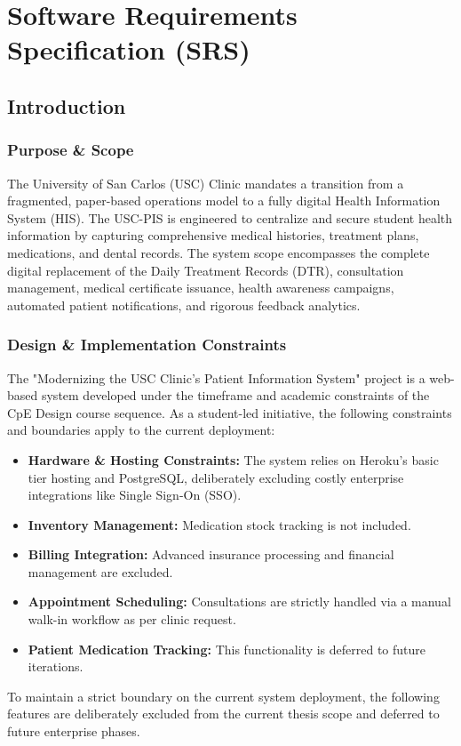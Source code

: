 
\chapter{Software Requirements Specification (SRS)}
\label{appendix:srs}

\section{Introduction}

\subsection{Purpose \& Scope}
The University of San Carlos (USC) Clinic mandates a transition from a fragmented, paper-based operations model to a fully digital Health Information System (HIS). The USC-PIS is engineered to centralize and secure student health information by capturing comprehensive medical histories, treatment plans, medications, and dental records. The system scope encompasses the complete digital replacement of the Daily Treatment Records (DTR), consultation management, medical certificate issuance, health awareness campaigns, automated patient notifications, and rigorous feedback analytics.

\subsection{Design \& Implementation Constraints}
The "Modernizing the USC Clinic's Patient Information System" project is a web-based system developed under the timeframe and academic constraints of the CpE Design course sequence. As a student-led initiative, the following constraints and boundaries apply to the current deployment:
\begin{itemize}
    \item \textbf{Hardware \& Hosting Constraints:} The system relies on Heroku's basic tier hosting and PostgreSQL, deliberately excluding costly enterprise integrations like Single Sign-On (SSO).
    \item \textbf{Inventory Management:} Medication stock tracking is not included.
    \item \textbf{Billing Integration:} Advanced insurance processing and financial management are excluded.
    \item \textbf{Appointment Scheduling:} Consultations are strictly handled via a manual walk-in workflow as per clinic request.
    \item \textbf{Patient Medication Tracking:} This functionality is deferred to future iterations.
\end{itemize}
To maintain a strict boundary on the current system deployment, the following features are deliberately excluded from the current thesis scope and deferred to future enterprise phases.

